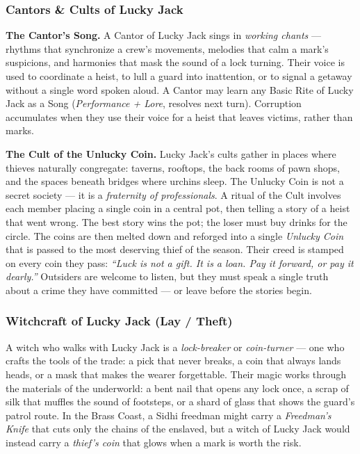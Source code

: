 \subsubsection*{Cantors \& Cults of Lucky Jack}

\textbf{The Cantor's Song.} A Cantor of Lucky Jack sings in \textit{working chants} --- rhythms that synchronize a crew's movements, melodies that calm a mark's suspicions, and harmonies that mask the sound of a lock turning. Their voice is used to coordinate a heist, to lull a guard into inattention, or to signal a getaway without a single word spoken aloud. A Cantor may learn any Basic Rite of Lucky Jack as a Song (\textit{Performance + Lore}, resolves next turn). Corruption accumulates when they use their voice for a heist that leaves victims, rather than marks.

\textbf{The Cult of the Unlucky Coin.} Lucky Jack's cults gather in places where thieves naturally congregate: taverns, rooftops, the back rooms of pawn shops, and the spaces beneath bridges where urchins sleep. The Unlucky Coin is not a secret society --- it is a \textit{fraternity of professionals}. A ritual of the Cult involves each member placing a single coin in a central pot, then telling a story of a heist that went wrong. The best story wins the pot; the loser must buy drinks for the circle. The coins are then melted down and reforged into a single \textit{Unlucky Coin} that is passed to the most deserving thief of the season. Their creed is stamped on every coin they pass: \textit{``Luck is not a gift. It is a loan. Pay it forward, or pay it dearly.''} Outsiders are welcome to listen, but they must speak a single truth about a crime they have committed --- or leave before the stories begin.

\subsubsection*{Witchcraft of Lucky Jack (Lay / Theft)}

A witch who walks with Lucky Jack is a \textit{lock-breaker} or \textit{coin-turner} --- one who crafts the tools of the trade: a pick that never breaks, a coin that always lands heads, or a mask that makes the wearer forgettable. Their magic works through the materials of the underworld: a bent nail that opens any lock once, a scrap of silk that muffles the sound of footsteps, or a shard of glass that shows the guard's patrol route. In the Brass Coast, a Sidhi freedman might carry a \textit{Freedman's Knife} that cuts only the chains of the enslaved, but a witch of Lucky Jack would instead carry a \textit{thief's coin} that glows when a mark is worth the risk.

